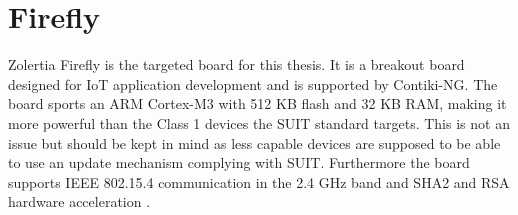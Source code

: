\documentclass[0-thesis.tex]{subfiles}
\begin{document}
\section{Firefly}
\label{sec:hardware}
Zolertia Firefly is the targeted board for this thesis. It is a breakout board designed
for IoT application development and is supported by Contiki-NG. The board sports an ARM
Cortex-M3 with 512 KB flash and 32 KB RAM, making it more powerful than the Class 1
devices the SUIT standard targets. This is not an issue but should be kept in mind as less
capable devices are supposed to be able to use an update mechanism complying with SUIT.
Furthermore the board supports IEEE 802.15.4 communication in the 2.4 GHz band and SHA2
and RSA hardware acceleration \parencite{firefly-datasheet}.
\end{document}
